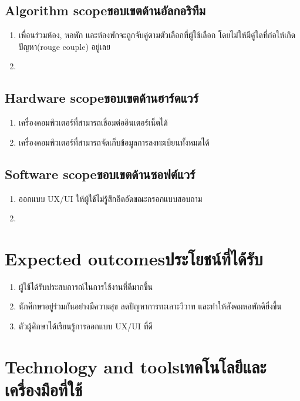\subsection{\ifenglish Algorithm scope\else ขอบเขตด้านอัลกอริทึม\fi}
\begin{enumerate}
    \item เพื่อนร่วมห้อง, หอพัก และห้องพักจะถูกจับคู่ตามตัวเลือกที่ผู้ใช้เลือก
    โดยไม่ให้มีคู่ใดที่ก่อให้เกิดปัญหา(rouge couple) อยู่เลย
    \item 
\end{enumerate}
\subsection{\ifenglish Hardware scope\else ขอบเขตด้านฮาร์ดแวร์\fi}
\begin{enumerate}
    \item เครื่องคอมพิวเตอร์ที่สามารถเชื่อมต่ออินเตอร์เน็ตได้
    \item เครื่องคอมพิวเตอร์ที่สามารถจัดเก็บข้อมูลการลงทะเบียนทั้งหมดได้
\end{enumerate}

\subsection{\ifenglish Software scope\else ขอบเขตด้านซอฟต์แวร์\fi}
\begin{enumerate}
    \item ออกแบบ UX/UI ให้ผู้ใช้ไม่รู้สึกอึดอัดขณะกรอกแบบสอบถาม
    \item 
\end{enumerate}

\section{\ifenglish Expected outcomes\else ประโยชน์ที่ได้รับ\fi}
\begin{enumerate}
    \item ผู้ใช้ได้รับประสบการณ์ในการใช้งานที่ดีมากขึ้น
    \item นักศึกษาอยู่ร่วมกันอย่างมีความสุข ลดปัญหาการทะเลาะวิวาท และทำให้สังคมหอพักดียิ่งขึ้น
    \item ตัวผู้ศึกษาได้เรียนรู้การออกแบบ UX/UI ที่ดี
\end{enumerate}

\section{\ifenglish Technology and tools\else เทคโนโลยีและเครื่องมือที่ใช้\fi}

